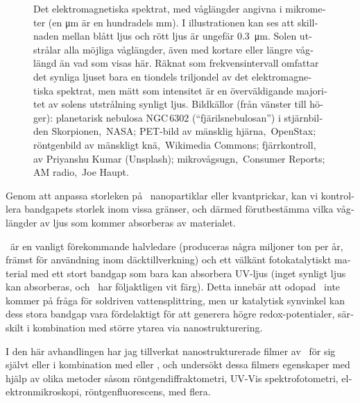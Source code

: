 \documentclass[webedition,openright,titles,swedish,english]{LuaUUThesis}\usepackage[]{graphicx}\usepackage[]{xcolor}
\begin{document}
\begin{otherlanguage}{swedish}
\begin{figure}[tbp]
\begin{adjustbox}{max width=\textwidth}
\end{adjustbox}
\caption[Det elektromagnetiska spektrat]{%
   Det elektromagnetiska spektrat, med våglängder angivna i mikrometer
   (en \unit{\micro\metre} är en hundradels \unit{\mm}). I illustrationen kan ses
   att skillnaden mellan blått ljus och rött ljus är ungefär \qty{0.3}{\micro\metre}.
   Solen utstrålar alla möjliga våglängder, även med kortare eller längre våglängd än vad som visas här.
   Räknat som frekvensintervall omfattar det synliga ljuset bara
   en tiondels triljondel av det elektromagnetiska spektrat,
   men mätt som intensitet är en överväldigande majoritet av solens utstrålning synligt ljus.
   {\footnotesize Bildkällor (från vänster till höger):
   planetarisk nebulosa NGC\,6302 (\enquote{fjärilsnebulosan}) i stjärnbilden Skorpionen, \CCBY[\tiny]\,NASA;
   PET-bild av mänsklig hjärna, \CCBY[\tiny]\,OpenStax;
   röntgenbild av mänskligt knä, \CCBYSA[\tiny]\,Wikimedia Commons;
   fjärrkontroll, av Priyanshu Kumar (Unsplash);
   mikrovågsugn, \CCBY[\tiny]\,Consumer Reports;
   AM radio, \CCBY[\tiny]\,Joe Haupt.}
}
\label{fig:0900-elektromagnetiskt-spektrum}
\end{figure}

Genom att anpassa storleken på \ZnO\ nanopartiklar eller kvantprickar, kan vi
kontrollera bandgapets storlek inom vissa gränser,
och därmed förutbestämma vilka våglängder av ljus som kommer absorberas
av materialet.

\ZnO\ är en vanligt förekommande halvledare (produceras några miljoner ton per år,
främst för användning inom däcktillverkning) och ett välkänt fotokatalytiskt material
med ett stort bandgap som bara kan absorbera UV-ljus (inget synligt ljus kan absorberas,
och \ZnO\ har följaktligen vit färg).
Detta innebär att odopad \ZnO\ inte kommer på fråga för soldriven vattensplittring,
men ur katalytisk synvinkel kan dess stora bandgap vara fördelaktigt för att generera
högre redox-potentialer, särskilt i kombination med större ytarea via nanostrukturering.

I den här avhandlingen har jag tillverkat nanostrukturerade filmer av
\ZnO\ för sig självt eller i kombination med  eller \ironox,
och undersökt dessa filmers egenskaper med hjälp av olika
metoder såsom röntgendiffraktometri, \gls{UV-Vis} spektrofotometri,
elektronmikroskopi, röntgenfluorescens, med flera.


\end{otherlanguage}
\end{document}

